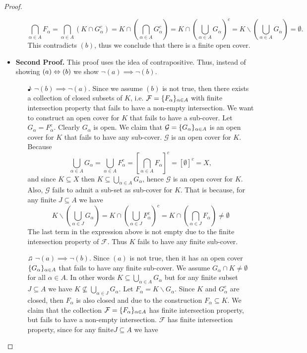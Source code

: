 \begin{proof}
\begin{itemize}
\begin{itemize}
			\[ \bigcap_{\alpha\in A} F_\alpha = \bigcap_{\alpha\in A}(K \cap G_\alpha^c) = K \cap (\bigcap_{\alpha\in A} G_\alpha^c) =  K \cap (\bigcup_{\alpha\in A} G_\alpha)^c = K \backslash (\bigcup_{\alpha\in A} G_\alpha) = \emptyset.  \]
			This contradicts $(b)$, thus we conclude that there is a finite open cover. 
		\end{itemize} 
		\item \textbf{Second Proof.} This proof uses the idea of contrapositive. Thus, instead of showing $(a) \Leftrightarrow (b)$ we show $\neg (a) \implies \neg (b)$.
		\begin{itemize}
			\item [$\eighthnote$] $\neg (b) \implies \neg(a)$. Since we assume $(b)$ is not true, then there exists a collection of closed subsets of $K$, i.e. $\mathcal{F} = \{F_{\alpha}\}_{\alpha\in A}$ with finite intersection property that fails to have a non-empty intersection. We want to construct an open cover for $K$ that fails to have a sub-cover. Let $G_\alpha = F_\alpha^c$. Clearly $G_\alpha$ is open. We claim that $\mathcal{G} = \{G_{\alpha}\}_{\alpha\in A}$ is an open cover for $K$ that fails to have any sub-cover. $\mathcal{G}$ is an open cover for $K$. Because
			\[ \bigcup_{\alpha \in A} G_\alpha = \bigcup_{\alpha\in A} F_\alpha^c = [\bigcap_{\alpha\in A} F_\alpha]^c  = [\emptyset]^c = X, \]
			and since $K \subseteq X$ then $K \subseteq \bigcup_{\alpha \in A} G_\alpha $, hence $\mathcal{G}$ is an open cover for $K$. Also, $\mathcal{G}$ fails to admit a sub-set as sub-cover for $K$. That is because, for any finite $J \subseteq A$ we have
			\[ K \backslash (\bigcup_{\alpha \in J} G_\alpha) = K \cap (\bigcup_{\alpha \in J} F^c_\alpha)^c  =  K \cap (\bigcap_{\alpha \in J} F_\alpha) \neq \emptyset  \]
			The last term in the expression above is not empty due to the finite intersection property of $\mathcal{F}$. Thus $K$ fails to have any finite sub-cover.
			\item [$\twonotes$] $\neg (a) \implies \neg(b)$. Since $(a)$ is not true, then it has an open cover $\{G_{\alpha}\}_{\alpha\in A}$ that fails to have any finite sub-cover. We assume $G_\alpha \cap K \neq \emptyset$ for all $\alpha \in A$. In other words $K \subseteq \bigcup_{\alpha\in A} G_\alpha$ but for any finite subset $J \subseteq A$ we have $K \not\subseteq \bigcup_{\alpha\in J} G_\alpha$. Let $F_\alpha = K \backslash G_\alpha$. Since $K$ and $G_\alpha^c$ are closed, then $F_\alpha$ is also closed and due to the construction $F_\alpha \subseteq K$. We claim that the collection $\mathcal{F} = \{F_{\alpha}\}_{\alpha\in A}$ has finite intersection property, but fails to have a non-empty intersection. $\mathcal{F}$ has finite intersection property, since for any finite$J \subseteq A$ we have

\end{itemize}
\end{itemize}
\end{proof}

